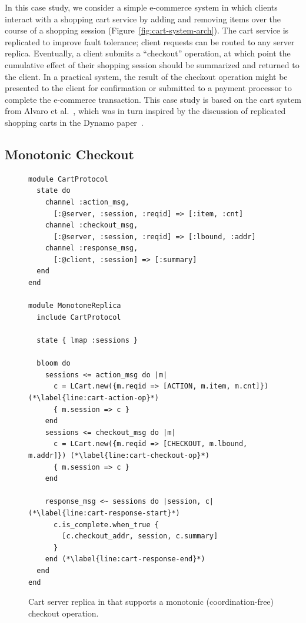 In this case study, we consider a simple e-commerce system in which clients
interact with a shopping cart service by adding and removing items over the
course of a shopping session (Figure~\ref{fig:cart-system-arch}). The cart
service is replicated to improve fault tolerance; client requests can be routed
to any server replica. Eventually, a client submits a ``checkout'' operation, at
which point the cumulative effect of their shopping session should be summarized
and returned to the client. In a practical system, the result of the checkout
operation might be presented to the client for confirmation or submitted to a
payment processor to complete the e-commerce transaction. This case study is
based on the cart system from Alvaro et al.~\cite{Alvaro2011}, which was in turn
inspired by the discussion of replicated shopping carts in the Dynamo
paper~\cite{DeCandia2007}.


\subsection{Monotonic Checkout}
\label{sec:monotone-checkout}

\begin{figure}[t]
\begin{scriptsize}
\begin{lstlisting}
module CartProtocol
  state do
    channel :action_msg,
      [:@server, :session, :reqid] => [:item, :cnt]
    channel :checkout_msg,
      [:@server, :session, :reqid] => [:lbound, :addr]
    channel :response_msg,
      [:@client, :session] => [:summary]
  end
end

module MonotoneReplica
  include CartProtocol

  state { lmap :sessions }

  bloom do
    sessions <= action_msg do |m|
      c = LCart.new({m.reqid => [ACTION, m.item, m.cnt]}) (*\label{line:cart-action-op}*)
      { m.session => c }
    end
    sessions <= checkout_msg do |m|
      c = LCart.new({m.reqid => [CHECKOUT, m.lbound, m.addr]}) (*\label{line:cart-checkout-op}*)
      { m.session => c }
    end

    response_msg <~ sessions do |session, c| (*\label{line:cart-response-start}*)
      c.is_complete.when_true {
        [c.checkout_addr, session, c.summary]
      }
    end (*\label{line:cart-response-end}*)
  end
end
\end{lstlisting}
\end{scriptsize}
\caption{Cart server replica in \lang that supports a monotonic
  (coordination-free) checkout operation.}
\label{fig:monotone-cart}
\end{figure}

